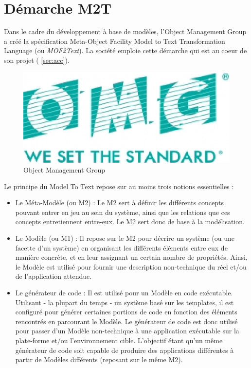 \section{Démarche M2T}\label{sec:m2t}

Dans le cadre du développement à base de modèles, l'Object Management Group \cite{omg} a créé la spécification Meta-Object Facility Model to Text Transformation Language (ou \textit{MOF2Text}). La société \kwobeo{} emploie cette démarche qui est au coeur de son projet \kwacceleo{} (\cf{} \ref{sec:acc}).

\begin{figure}[htb]
  \centering
  \includegraphics[scale=.6]{img/omg.eps}
  \caption{Object Management Group}
  \label{fig:omg}
\end{figure}


Le principe du Model To Text repose sur au moins trois notions essentielles :
\begin{itemize}
\item Le Méta-Modèle (ou M2) : Le M2 sert à définir les différents concepts pouvant entrer en jeu au sein du système, ainsi que les relations que ces concepts entretiennent entre-eux. Le M2 sert donc de base à la modélisation.
\item Le Modèle (ou M1) : Il repose sur le M2 pour décrire un système (ou une facette d'un système) en organisant les différents éléments entre eux de manière concrète, et en leur assignant un certain nombre de propriétés. Ainsi, le Modèle est utilisé pour fournir une description non-technique du réel et/ou de l'application attendue.
\item Le générateur de code : Il est utilisé pour  un Modèle en code exécutable. Utilisant - la plupart du temps - un système basé sur les templates, il est configuré pour générer certaines portions de code en fonction des éléments rencontrés en parcourant le Modèle. Le générateur de code est donc utilisé pour passer d'un Modèle non-technique à une application exécutable sur la plate-forme et/ou l'environnement cible. L'objectif étant qu'un même générateur de code soit capable de produire des applications différentes à partir de Modèles différents (reposant sur le même M2).\\
\end{itemize}

